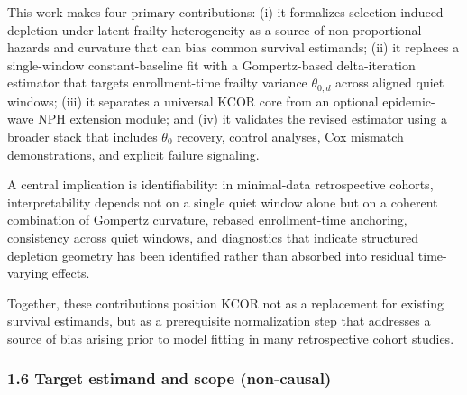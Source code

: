 \documentclass[
]{article}
\begin{document}
This work makes four primary contributions: (i) it formalizes
selection-induced depletion under latent frailty heterogeneity as a
source of non-proportional hazards and curvature that can bias common
survival estimands; (ii) it replaces a single-window constant-baseline
fit with a Gompertz-based delta-iteration estimator that targets
enrollment-time frailty variance \(\theta_{0,d}\) across aligned quiet
windows; (iii) it separates a universal KCOR core from an optional
epidemic-wave NPH extension module; and (iv) it validates the revised
estimator using a broader stack that includes \(\theta_0\) recovery,
control analyses, Cox mismatch demonstrations, and explicit failure
signaling.

A central implication is identifiability: in minimal-data retrospective
cohorts, interpretability depends not on a single quiet window alone but
on a coherent combination of Gompertz curvature, rebased enrollment-time
anchoring, consistency across quiet windows, and diagnostics that
indicate structured depletion geometry has been identified rather than
absorbed into residual time-varying effects.

Together, these contributions position KCOR not as a replacement for
existing survival estimands, but as a prerequisite normalization step
that addresses a source of bias arising prior to model fitting in many
retrospective cohort studies.

\subsubsection{1.6 Target estimand and scope
(non-causal)}\label{target-estimand-and-scope-non-causal}
\end{document}
